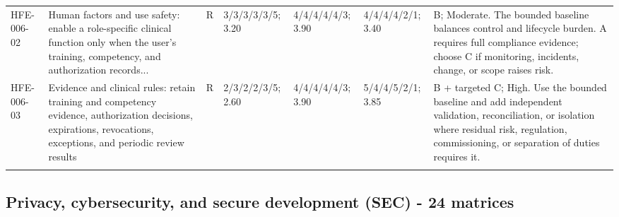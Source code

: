 \documentclass[11pt,letterpaper]{article}
\begin{document}
\begin{scriptsize}
\begin{longtable}{@{}L{0.11\textwidth}L{0.165\textwidth}L{0.04\textwidth}L{0.115\textwidth}L{0.115\textwidth}L{0.115\textwidth}L{0.235\textwidth}@{}}
\addlinespace[2pt]
HFE-006-02 & Human factors and use safety: enable a role-specific clinical function only when the user's training, competency, and authorization records... & R & 3/3/3/3/3/5; 3.20 & 4/4/4/4/4/3; 3.90 & 4/4/4/4/2/1; 3.40 & B; Moderate. The bounded baseline balances control and lifecycle burden. A requires full compliance evidence; choose C if monitoring, incidents, change, or scope raises risk. \\
\addlinespace[2pt]
HFE-006-03 & Evidence and clinical rules: retain training and competency evidence, authorization decisions, expirations, revocations, exceptions, and periodic review results & R & 2/3/2/2/3/5; 2.60 & 4/4/4/4/4/3; 3.90 & 5/4/4/5/2/1; 3.85 & B + targeted C; High. Use the bounded baseline and add independent validation, reconciliation, or isolation where residual risk, regulation, commissioning, or separation of duties requires it. \\
\addlinespace[2pt]
\end{longtable}
\end{scriptsize}

\subsection{Privacy, cybersecurity, and secure development (SEC) - 24 matrices}
\end{document}
